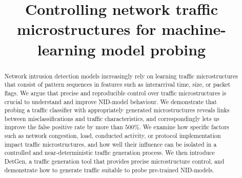 \documentclass[runningheads]{llncs}
\begin{document}
\title{Controlling network traffic microstructures for machine-learning model probing}
%
%
%
%
%
\maketitle 

\begin{abstract}
Network intrusion detection models increasingly rely on learning traffic microstructures that consist of pattern sequences in features such as interarrival time, size, or packet flags. We argue that precise and reproducible control over traffic microstructures is crucial to understand and improve NID-model behaviour.
We demonstrate that probing a traffic classifier with appropriately generated microstructures reveals links between misclassifications and traffic characteristics, and correspondingly lets us improve the false positive rate by more than $500\%$. We examine how specific factors such as network congestion, load, conducted activity, or protocol implementation impact traffic microstructures, and how well their influence can be isolated in a controlled and near-deterministic traffic generation process. We then introduce DetGen, a traffic generation tool that provides precise microstructure control, and demonstrate how to generate traffic suitable to probe pre-trained NID-models.
\end{abstract}
\end{document}
